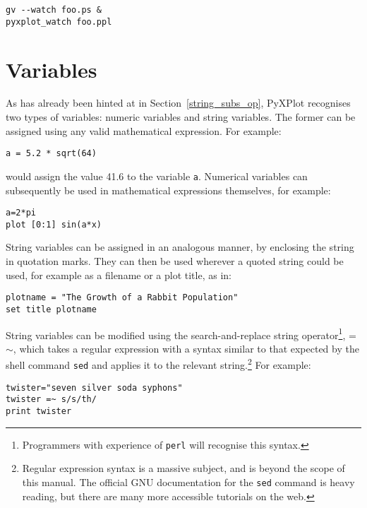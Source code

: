 \begin{verbatim}
gv --watch foo.ps &
pyxplot_watch foo.ppl
\end{verbatim}

\section{Variables}

As has already been hinted at in Section~\ref{string_subs_op}, PyXPlot
recognises two types of variables: numeric variables and string variables.  The
former can be assigned using any valid mathematical expression. For example:

\begin{verbatim}
a = 5.2 * sqrt(64)
\end{verbatim}

\noindent would assign the value 41.6 to the variable {\tt a}.  Numerical variables can
subsequently be used in mathematical expressions themselves, for example:

\begin{verbatim}
a=2*pi
plot [0:1] sin(a*x)
\end{verbatim}

\noindent String variables can be assigned in an analogous manner, by enclosing
the string in quotation marks. They can then be used wherever a quoted string
could be used, for example as a filename or a plot title, as
in:

\begin{verbatim}
plotname = "The Growth of a Rabbit Population"
set title plotname
\end{verbatim}

String variables can be modified using the search-and-replace string
operator\footnote{Programmers with
experience of {\tt perl} will recognise this syntax.}, =$\sim$, which takes a regular expression with a syntax similar to that
expected by the shell command {\tt sed} and applies it to the relevant string.\footnote{Regular expression
syntax is a massive subject, and is beyond the scope of this manual. The
official GNU documentation for the {\tt sed} command is heavy reading, but
there are many more accessible tutorials on the web.} For example:

\begin{verbatim}
twister="seven silver soda syphons"
twister =~ s/s/th/
print twister
\end{verbatim}

